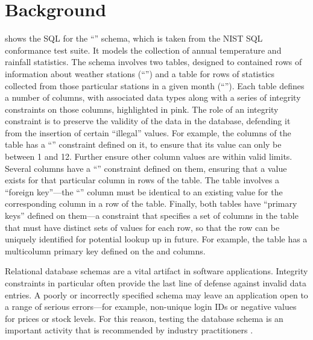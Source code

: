 
\section{Background}
\label{sec:background}



 shows the SQL for the ``\NistWeather'' schema, which is taken from the NIST SQL conformance test suite. It models the collection of annual temperature and rainfall statistics. The schema involves two tables, designed to contained rows of information about weather stations (``'') and a table for rows of statistics collected from those particular stations in a given month (``''). Each table defines a number of columns, with associated data types along with a series of integrity constraints on those columns, highlighted in pink. The role of an integrity constraint is to preserve the validity of the data in the database, defending it from the insertion of certain ``illegal'' values. For example, the  columns of the  table has a ``\CHECK'' constraint defined on it, to ensure that its value can only be between 1 and 12. Further \CCs ensure other column values are within valid limits. Several columns have a ``\NOTNULL'' constraint defined on them, ensuring that a value exists for that particular column in rows of the table. The  table involves a ``foreign key''---the ``'' column must be identical to an existing value for the corresponding  column in a row of the  table. Finally, both tables have ``primary keys'' defined on them---a constraint that specifies a set of columns in the table that must have distinct sets of values for each row, so that the row can be uniquely identified for potential lookup up in future. For example, the  table has a multicolumn primary key defined on the  and  columns. 

Relational database schemas are a vital artifact in software applications. Integrity constraints in particular often provide the last line of defense against invalid data entries. A poorly or incorrectly specified schema may leave an application open to a range of serious errors---for example, non-unique login IDs or negative values for prices or stock levels. For this reason, testing the database schema is an important activity that is recommended by industry practitioners \cite{DzoneDatabaseTesting}. 


